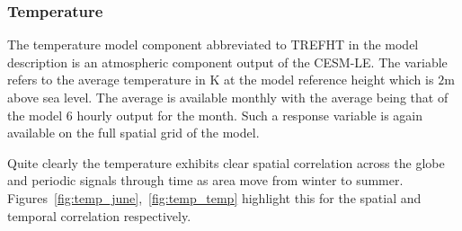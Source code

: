 
\subsubsection{Temperature \label{sssec:temp}}
The temperature model component abbreviated to TREFHT in the model description is an atmospheric component output of the CESM-LE.
The variable refers to the average temperature in $\si{\kelvin}$ at the model reference height which is $2\si{\meter}$ above sea level.
The average is available monthly with the average being that of the model 6 hourly output for the month.
Such a response variable is again available on the full spatial grid of the model. 

Quite clearly the temperature exhibits clear spatial correlation across the globe and periodic signals through time as area move from winter to summer.
Figures~\ref{fig:temp_june},~\ref{fig:temp_temp} highlight this for the spatial and temporal correlation respectively.

